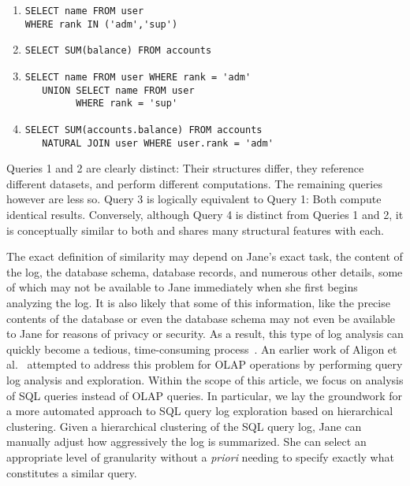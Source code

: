 {\footnotesize
\begin{enumerate}
\item \begin{verbatim}
SELECT name FROM user
WHERE rank IN ('adm','sup')
\end{verbatim}
\item \begin{verbatim}
SELECT SUM(balance) FROM accounts
\end{verbatim}
\item \begin{verbatim}
SELECT name FROM user WHERE rank = 'adm'
   UNION SELECT name FROM user
         WHERE rank = 'sup'
\end{verbatim}
\item \begin{verbatim}
SELECT SUM(accounts.balance) FROM accounts 
   NATURAL JOIN user WHERE user.rank = 'adm'
\end{verbatim}
\end{enumerate}

}

Queries 1 and 2 are clearly distinct: Their structures differ, they reference different datasets, and perform different computations. 
The remaining queries however are less so.  
Query 3 is logically equivalent to Query 1: Both compute identical results.
Conversely, although Query 4 is distinct from Queries 1 and 2, it is conceptually similar to both and shares many structural features with each.

The exact definition of similarity may depend on Jane's exact task, the content of the log, the database schema, database records, and numerous other details, some of which may not be available to Jane immediately when she first begins analyzing the log.
It is also likely that some of this information, like the precise contents of the database or even the database schema may not even be available to Jane for reasons of privacy or security.
As a result, this type of log analysis can quickly become a tedious, time-consuming process~\cite{gatterbauer2011databases}.
An earlier work of Aligon et al.~\cite{aligon2014holistic} attempted to address this problem for OLAP operations by performing query log analysis and exploration. 
Within the scope of this article, we focus on analysis of SQL queries instead of OLAP queries.
In particular, we lay the groundwork for a more automated approach to SQL query log exploration based on hierarchical clustering.  
Given a hierarchical clustering of the SQL query log, Jane can manually adjust how aggressively the log is summarized.
She can select an appropriate level of granularity without a \emph{priori} needing to specify exactly what constitutes a similar query.

